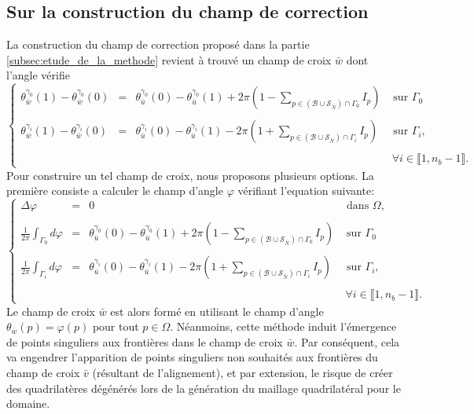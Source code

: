 \subsection{Sur la construction du champ de correction}
La construction du champ de correction proposé dans la partie \ref{subsec:etude_de_la_methode} revient à trouvé un champ de croix $\bar{w}$ dont l'angle vérifie
\begin{equation}
    \left\{
    \begin{array}{lcll}
    \theta_{\bar{w}}^{\gamma_0}(1)-\theta_{\bar{w}}^{\gamma_0}(0)&=&\theta_{\bar{u}}^{\gamma_0}(0)-\theta_{\bar{u}}^{\gamma_0}(1)+2\pi\left(1-\displaystyle\sum_{p\in(\mathcal{B}\cup\mathcal{S}_{\bar{N}})\cap\Gamma_0}I_p\right)&\mbox{ sur }\Gamma_0\\\\
    \theta_{\bar{w}}^{\gamma_i}(1)-\theta_{\bar{w}}^{\gamma_i}(0)&=&\theta_{\bar{u}}^{\gamma_i}(0)-\theta_{\bar{u}}^{\gamma_i}(1)-2\pi\left(1+\displaystyle\sum_{p\in(\mathcal{B}\cup\mathcal{S}_{\bar{N}})\cap\Gamma_i}I_p\right)&\mbox{ sur }\Gamma_i,\\\\
    &&&~\forall i\in\llbracket 1, n_b-1\rrbracket.
    \end{array}
    \right.
    \label{eqn:disc_hypothese_w}
\end{equation}
Pour construire un tel champ de croix, nous proposons plusieurs options. La première consiste a calculer le champ d'angle $\varphi$ vérifiant l'equation suivante:
\begin{equation}
\left\{
\begin{array}{lcll}
    \Delta\varphi &=& 0 & \mbox{ dans }\Omega,\\\\
    \displaystyle\frac{1}{2\pi}\displaystyle\int_{\Gamma_0}d\varphi &=& \theta_{\bar{u}}^{\gamma_0}(0)-\theta_{\bar{u}}^{\gamma_0}(1)+2\pi\left(1-\displaystyle\sum_{p\in(\mathcal{B}\cup\mathcal{S}_{\bar{N}})\cap\Gamma_0}I_p\right)&\mbox{ sur }\Gamma_0\\\\
    \displaystyle\frac{1}{2\pi}\displaystyle\int_{\Gamma_i}d\varphi &=& \theta_{\bar{u}}^{\gamma_i}(0)-\theta_{\bar{u}}^{\gamma_i}(1)-2\pi\left(1+\displaystyle\sum_{p\in(\mathcal{B}\cup\mathcal{S}_{\bar{N}})\cap\Gamma_i}I_p\right)&\mbox{ sur }\Gamma_i,\\\\
    &&&~\forall i\in\llbracket 1, n_b-1\rrbracket.
\end{array}
\right.
\end{equation}
Le champ de croix $\bar{w}$ est alors formé en utilisant le champ d'angle $\theta_{\bar{w}}(p)=\varphi(p)$ pour tout $p\in\Omega$. Néanmoins, cette méthode induit l'émergence de points singuliers aux frontières dans le champ de croix $\bar{w}$. Par conséquent, cela va engendrer l'apparition de points singuliers non souhaités aux frontières du champ de croix $\bar{v}$ (résultant de l'alignement), et par extension, le risque de créer des quadrilatères dégénérés lors de la génération du maillage quadrilatéral pour le domaine.

